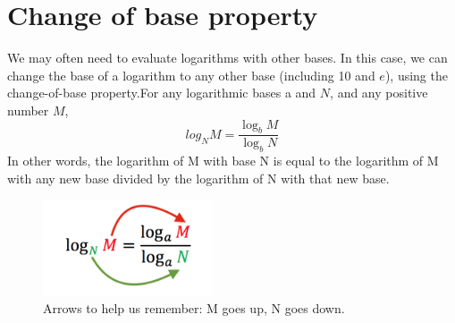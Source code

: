 \section{Change of base property}
We may often need to evaluate logarithms with other bases. In this case, we can change the base of a logarithm to any other base (including 10 and $e$), using the change-of-base property.For any logarithmic bases a and $N$, and any positive number $M$,
		\begin{equation}
			log_{N}M = \frac{\log_{b}M}{\log_{b}N}
		\end{equation}
In other words, the logarithm of M with base N is equal to the logarithm of M with any new base divided by the logarithm of N with that new base.
%
	\begin{figure}[H]
		 \includegraphics[width=5cm]{pics/change_base.png}
		 \centering
		 \caption{Arrows to help us remember: M goes up, N goes down.\\}
	\end{figure}
%


